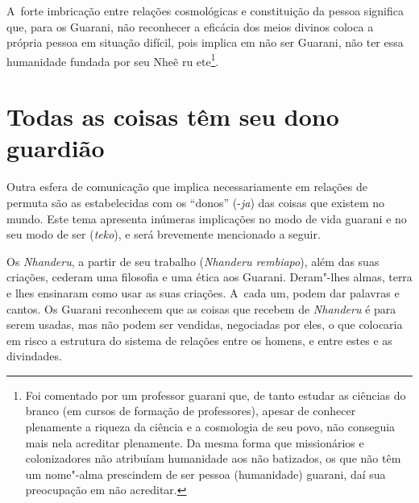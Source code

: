 A~forte imbricação entre relações cosmológicas e constituição da pessoa
significa que, para os Guarani, não reconhecer a eficácia dos meios
divinos coloca a própria pessoa em situação difícil, pois implica em
não ser Guarani, não ter essa humanidade fundada por seu Nheẽ ru
ete\footnote{Foi comentado por um professor guarani que, de tanto
estudar as ciências do branco (em cursos de formação de professores),
apesar de conhecer plenamente a riqueza da ciência e a cosmologia de
seu povo, não conseguia mais nela acreditar plenamente. Da mesma forma
que missionários e colonizadores não atribuíam humanidade aos não
batizados, os que não têm um nome"-alma prescindem de ser pessoa
(humanidade) guarani, daí sua preocupação em não acreditar.}. 

\section{Todas as coisas têm seu dono guardião}

Outra esfera de comunicação que implica necessariamente em relações de
permuta são as estabelecidas com os ``donos'' (-\emph{ja}) das coisas que
existem no mundo. Este tema apresenta inúmeras implicações no modo de
vida guarani e no seu modo de ser (\emph{teko}), e será brevemente mencionado
a seguir. 

Os \emph{Nhanderu}, a partir de seu trabalho (\emph{Nhanderu rembiapo}), além das suas
criações, cederam uma filosofia e uma ética aos Guarani. Deram"-lhes
almas, terra e lhes ensinaram como usar as suas criações. A~cada um,
podem dar palavras e cantos. Os Guarani reconhecem que as coisas que
recebem de \emph{Nhanderu} é para serem usadas, mas não podem ser vendidas,
negociadas por eles, o que colocaria em risco a estrutura do sistema de
relações entre os homens, e entre estes e as divindades. 

